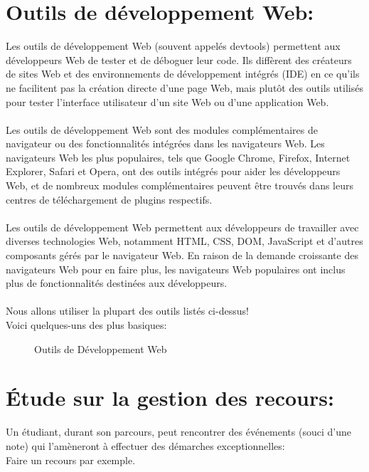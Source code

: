\documentclass[12pt]{report}
\begin{document}
\section{Outils de développement Web:}
\vspace{0.2in}
Les outils de développement Web (souvent appelés devtools) permettent aux développeurs Web de tester et de déboguer leur code. Ils diffèrent des créateurs de sites Web et des environnements de développement intégrés (IDE) en ce qu'ils ne facilitent pas la création directe d'une page Web, mais plutôt des outils utilisés pour tester l'interface utilisateur d'un site Web ou d'une application Web.
\\\\
Les outils de développement Web sont des modules complémentaires de navigateur ou des fonctionnalités intégrées dans les navigateurs Web. Les navigateurs Web les plus populaires, tels que Google Chrome, Firefox, Internet Explorer, Safari et Opera, ont des outils intégrés pour aider les développeurs Web, et de nombreux modules complémentaires peuvent être trouvés dans leurs centres de téléchargement de plugins respectifs.
\\\\
Les outils de développement Web permettent aux développeurs de travailler avec diverses technologies Web, notamment HTML, CSS, DOM, JavaScript et d'autres composants gérés par le navigateur Web. En raison de la demande croissante des navigateurs Web pour en faire plus, les navigateurs Web populaires ont inclus plus de fonctionnalités destinées aux développeurs.
\\\\
Nous allons utiliser la plupart des outils listés ci-dessus!
\\
Voici quelques-uns des plus basiques:

\vspace{0.2in}

\begin{figure}[h]
\centering
\caption{Outils de Développement Web}
\end{figure}

\newpage

\section{Étude sur la gestion des recours:}
\vspace{0.2in}
Un étudiant, durant son parcours, peut rencontrer des événements (souci d’une note) qui l'amèneront à effectuer des démarches exceptionnelles:
\\
Faire un recours par exemple.
\end{document}
